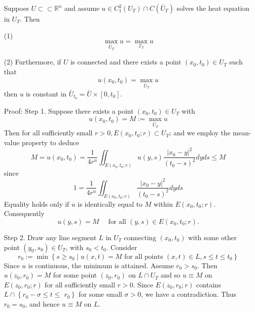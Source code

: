 \begin{theorem}
    Suppoes $U \subset \subset \mathbb{R}^n$ and
    assume $u \in C_1^2\left(U_T\right) \cap C\left(\bar{U}_T\right)$ solves the heat equation in $U_T$.
    Then

    (1)
    \begin{equation*}
        \max _{\bar{U}_T} u=\max _{\Gamma_T} u
    \end{equation*}

    (2) Furthermore, if $U$ is connected and there exists a point $\left(x_0, t_0\right) \in U_T$ such that
    \begin{equation*}
        u\left(x_0, t_0\right)=\max _{\bar{U}_T} u
    \end{equation*}
    then $u$ is constant in $\bar{U}_{t_0} =\bar{U} \times [0, t_0 ]$.

    Proof:
    Step 1. Suppose there exists a point $\left(x_0, t_0\right) \in U_T$ with
    \begin{equation*}
        u\left(x_0, t_0\right)
        =
        M
        :=
        \max_{\bar{U}_T} u
    \end{equation*}
    Then for all sufficiently small $r>0, E\left(x_0, t_0 ; r\right) \subset U_T$; and we employ the mean-value property to deduce
    \begin{equation*}
        M=u\left(x_0, t_0\right)=\frac{1}{4 r^n} \iint_{E\left(x_0, t_0 ; r\right)} u(y, s) \frac{\left|x_0-y\right|^2}{\left(t_0-s\right)^2} d y d s \leq M
    \end{equation*}
    since
    \begin{equation*}
        1=\frac{1}{4 r^n} \iint_{E\left(x_0, t_0 ; r\right)} \frac{\left|x_0-y\right|^2}{\left(t_0-s\right)^2} d y d s
    \end{equation*}
    Equality holds only if $u$ is identically equal to $M$ within $E\left(x_0, t_0 ; r\right)$.
    Consequently
    \begin{equation*}
        u(y, s)=M \quad \text { for all }(y, s) \in E\left(x_0, t_0 ; r\right) .
    \end{equation*}

    Step 2.
    Draw any line segment $L$ in $U_T$ connecting $\left(x_0, t_0\right)$ with some other point $\left(y_0, s_0\right) \in U_T$, with $s_0<t_0$. Consider
    \begin{equation*}
        r_0:=\min \left\{s \geq s_0 \mid u(x, t)=M \text { for all points }(x, t) \in L, s \leq t \leq t_0\right\}
    \end{equation*}
    Since $u$ is continuous, the minimum is attained. Assume $r_0>s_0$. Then $u\left(z_0, r_0\right)=M$ for some point $\left(z_0, r_0\right)$ on $L \cap U_T$ and so $u \equiv M$ on $E\left(z_0, r_0 ; r\right)$ for all sufficiently small $r>0$. Since $E\left(z_0, r_0 ; r\right)$ contains $L \cap\left\{r_0-\sigma \leq t \leq\right.$ $\left.r_0\right\}$ for some small $\sigma>0$, we have a contradiction. Thus $r_0=s_0$, and hence $u \equiv M$ on $L$.


\end{theorem}
